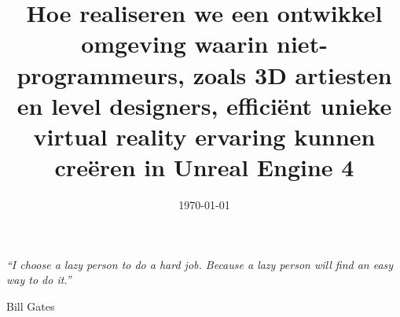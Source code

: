 \documentclass[a4paper, 11pt, oneside]{Thesis}  %
\begin{document}
\frontmatter      %

\title  {Hoe realiseren we een ontwikkel omgeving waarin niet-programmeurs, zoals 3D artiesten en level designers, efficiënt unieke virtual reality ervaring kunnen creëren in Unreal Engine 4}
\addresses  {\groupname\\\deptname\\\univname}  %
\date       {\today}
\subject    {Virtual Reality}
\keywords   {}

\maketitle


\fancyhead{}  %
\rhead{\thepage}  %
\lhead{}  %

\pagestyle{fancy}  %

\pagestyle{empty}  %

\null\vfill
\textit{``I choose a lazy person to do a hard job. Because a lazy person will find an easy way to do it.''}

\begin{flushright}
Bill Gates
\end{flushright}

\vfill\vfill\vfill\vfill\vfill\vfill\null
\clearpage  %

\end{document}
